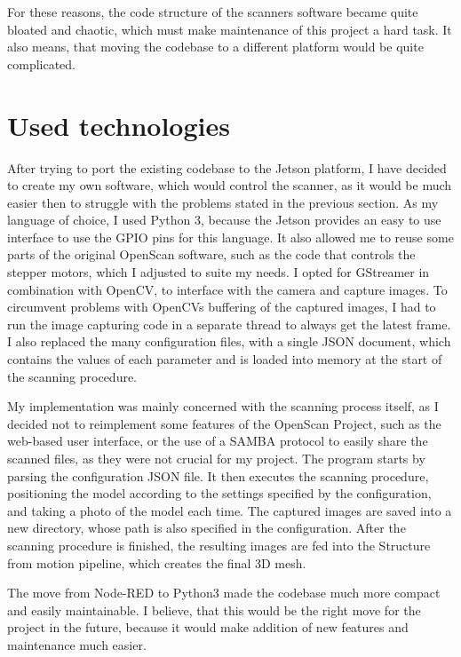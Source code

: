 For these reasons, the code structure of the scanners software became quite bloated and chaotic, which must make maintenance of this project a hard task.
It also means, that moving the codebase to a different platform would be quite complicated.


\section{Used technologies}
After trying to port the existing codebase to the Jetson platform, I have decided to create my own software, which would control the scanner, as it would be much easier then to struggle with the problems stated in the previous section.
As my language of choice, I used Python 3, because the Jetson provides an easy to use interface to use the GPIO pins for this language.
It also allowed me to reuse some parts of the original OpenScan software, such as the code that controls the stepper motors, which I adjusted to suite my needs.
I opted for GStreamer in combination with OpenCV, to interface with the camera and capture images.
To circumvent problems with OpenCVs buffering of the captured images, I had to run the image capturing code in a separate thread to always get the latest frame.
I also replaced the many configuration files, with a single JSON document, which contains the values of each parameter and is loaded into memory at the start of the scanning procedure.

My implementation was mainly concerned with the scanning process itself, as I decided not to reimplement some features of the OpenScan Project, such as the web-based user interface, or the use of a SAMBA protocol to easily share the scanned files, as they were not crucial for my project.
The program starts by parsing the configuration JSON file.
It then executes the scanning procedure, positioning the model according to the settings specified by the configuration, and taking a photo of the model each time.
The captured images are saved into a new directory, whose path is also specified in the configuration.
After the scanning procedure is finished, the resulting images are fed into the Structure from motion pipeline, which creates the final 3D mesh.

The move from Node-RED to Python3 made the codebase much more compact and easily maintainable.
I believe, that this would be the right move for the project in the future, because it would make addition of new features and maintenance much easier.

